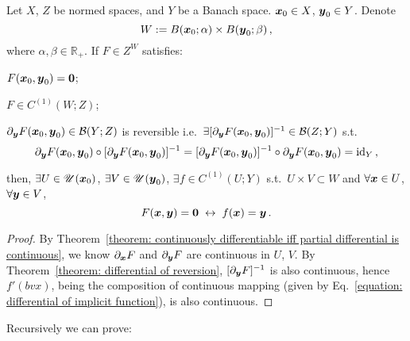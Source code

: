 \documentclass[openany]{book}
\begin{document}
\begin{theorem}
	\label{theorem: continuous differentiability of implicit function}
	Let $X$, $Z$ be normed spaces, and $Y$ be a Banach space.
	$\boldsymbol{x}_0 \in X$, $\boldsymbol{y}_0 \in Y$. Denote
	\begin{equation*}
		W := B(\boldsymbol{x}_0; \alpha) \times B(\boldsymbol{y}_0; \beta)\,,
	\end{equation*}
	where $\alpha, \beta \in \mathbb R_+$.
	If $F \in Z^W$ satisfies:
	\begin{conditionlist}[label=\alph*)]
		\item $F(\boldsymbol{x}_0, \boldsymbol{y}_0) = \boldsymbol{0}$;
		\item $F \in C^{(1)}(W; Z)$; 
		\item $\partial_{\boldsymbol{y}} F(\boldsymbol{x}_0, \boldsymbol{y}_0) \in \mathcal B(Y; Z)$ is reversible i.e.\ $\exists [\partial_{\boldsymbol{y}} F(\boldsymbol{x}_0, \boldsymbol{y}_0)]^{-1} \in \mathcal B(Z; Y)$ s.t.
		\begin{equation*}
			\partial_{\boldsymbol{y}} F(\boldsymbol{x}_0, \boldsymbol{y}_0) \circ [\partial_{\boldsymbol{y}} F(\boldsymbol{x}_0, \boldsymbol{y}_0)]^{-1} 
			= [\partial_{\boldsymbol{y}} F(\boldsymbol{x}_0, \boldsymbol{y}_0)]^{-1} \circ \partial_{\boldsymbol{y}} F(\boldsymbol{x}_0, \boldsymbol{y}_0) = \operatorname{id}_Y\,,
		\end{equation*}
	\end{conditionlist}
	then, $\exists U \in \mathscr U(\boldsymbol{x}_0)$, $\exists V \in \mathscr U(\boldsymbol{y}_0)$, $\exists f \in C^{(1)}(U; Y)$ s.t.\ $U \times V \subset W$ and $\forall \boldsymbol{x} \in U$, $\forall \boldsymbol{y} \in V$, 
	\begin{equation*}
		F(\boldsymbol{x}, \boldsymbol{y}) = \boldsymbol{0}
		\;\leftrightarrow\;
		f(\boldsymbol{x}) = \boldsymbol{y}\,.
	\end{equation*}
\end{theorem}
\begin{proof}
	By Theorem~\ref{theorem: continuously differentiable iff partial differential is continuous}, we know $\partial_{\boldsymbol{x}} F$ and $\partial_{\boldsymbol{y}} F$ are continuous in $U$, $V$.
	By Theorem~\ref{theorem: differential of reversion}, $[\partial_{\boldsymbol{y}} F]^{-1}$ is also continuous, hence $f'(bv x)$, being the composition of continuous mapping (given by Eq.~\ref{equation: differential of implicit function}), is also continuous.
\end{proof}

Recursively we can prove:
\end{document}
